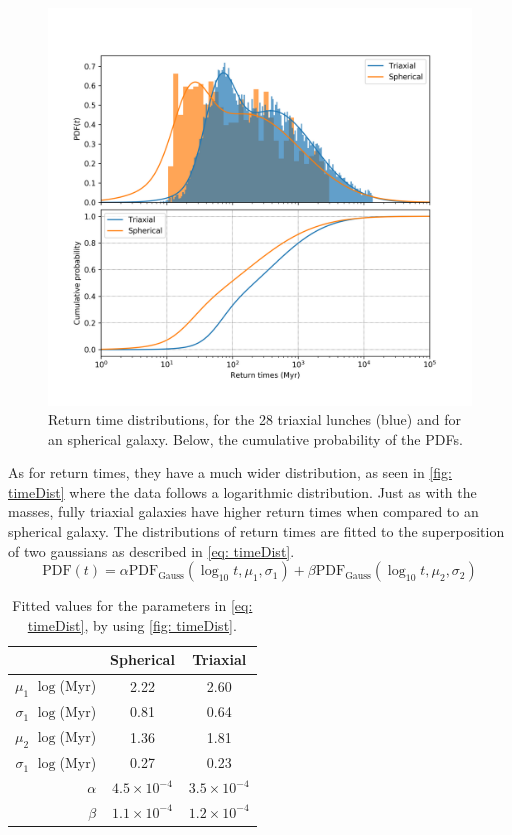 	\begin{figure}[h]
		\centering
		\includegraphics[width = 0.8\linewidth]{"../Files/Week 14/dist_times"}
		\caption{Return time distributions, for the 28 triaxial lunches (blue) and for an spherical galaxy. Below, the cumulative probability of the PDFs.}
		\label{fig: timeDist}
	\end{figure}

	As for return times, they have a much wider distribution, as seen in \autoref{fig: timeDist} where the data follows a logarithmic distribution. Just as with the masses, fully triaxial galaxies have higher return times when compared to an spherical galaxy. The distributions of return times are fitted to the superposition of two gaussians as described in \autoref{eq: timeDist}.
	\begin{equation}\label{eq: timeDist}
		\text{PDF}(t) = \alpha \text{PDF}_\text{Gauss}(\log_{10}t, \mu_1, \sigma_1) + \beta \text{PDF}_\text{Gauss}(\log_{10}t, \mu_2, \sigma_2)
	\end{equation}
	
	\begin{table}[h]
		\centering
		\caption{Fitted values for the parameters in \autoref{eq: timeDist}, by using \autoref{fig: timeDist}.}
		\begin{tabular}{r|cc}
			\hline
			& \textbf{Spherical} & \textbf{Triaxial} \\
			\hline
			$\mu_1$ $\log$(Myr) & 2.22 & 2.60\\
			$\sigma_1$ $\log$(Myr) & 0.81 & 0.64\\
			$\mu_2$ $\log$(Myr) & 1.36 & 1.81\\
			$\sigma_1$ $\log$(Myr) & 0.27 & 0.23\\
			$\alpha$ & $4.5\times10^{-4}$ & $3.5\times10^{-4}$\\
			$\beta$ & $1.1\times10^{-4}$ & $1.2\times10^{-4}$\\
			\hline
		\end{tabular}
	\end{table}
	
